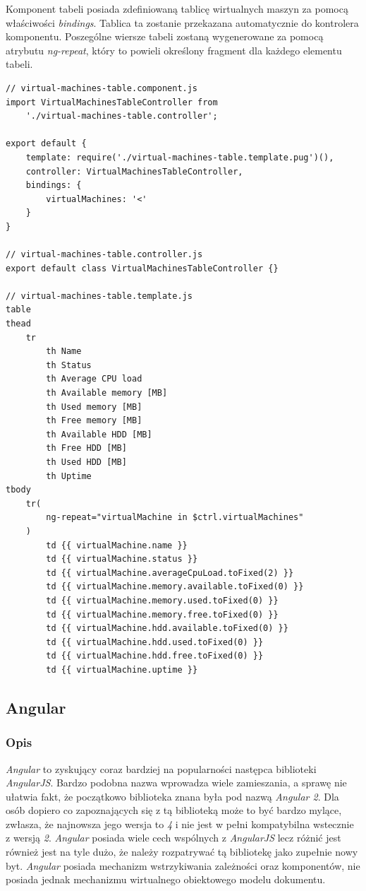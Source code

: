 \documentclass[polish, twoside, 12pt]{mwart}
\begin{document}
Komponent tabeli posiada zdefiniowaną tablicę wirtualnych maszyn za pomocą właściwości \emph{bindings}. Tablica ta zostanie przekazana automatycznie do kontrolera komponentu. Poszególne wiersze tabeli zostaną wygenerowane za pomocą atrybutu \emph{ng-repeat}, który to powieli określony fragment dla każdego elementu tabeli.

\begin{lstlisting}[caption=Komponent tabeli]
// virtual-machines-table.component.js
import VirtualMachinesTableController from
    './virtual-machines-table.controller';

export default {
    template: require('./virtual-machines-table.template.pug')(),
    controller: VirtualMachinesTableController,
    bindings: {
        virtualMachines: '<'
    }
}

// virtual-machines-table.controller.js
export default class VirtualMachinesTableController {}

// virtual-machines-table.template.js
table
thead
    tr
        th Name
        th Status
        th Average CPU load
        th Available memory [MB]
        th Used memory [MB]
        th Free memory [MB]
        th Available HDD [MB]
        th Free HDD [MB]
        th Used HDD [MB]
        th Uptime
tbody
    tr(
        ng-repeat="virtualMachine in $ctrl.virtualMachines"
    )
        td {{ virtualMachine.name }}
        td {{ virtualMachine.status }}
        td {{ virtualMachine.averageCpuLoad.toFixed(2) }}
        td {{ virtualMachine.memory.available.toFixed(0) }}
        td {{ virtualMachine.memory.used.toFixed(0) }}
        td {{ virtualMachine.memory.free.toFixed(0) }}
        td {{ virtualMachine.hdd.available.toFixed(0) }}
        td {{ virtualMachine.hdd.used.toFixed(0) }}
        td {{ virtualMachine.hdd.free.toFixed(0) }}
        td {{ virtualMachine.uptime }}
\end{lstlisting}

\subsection{Angular}

\subsubsection{Opis}

\emph{Angular} to zyskujący coraz bardziej na popularności następca biblioteki \emph{AngularJS}. Bardzo podobna nazwa wprowadza wiele zamieszania, a sprawę nie ułatwia fakt, że początkowo biblioteka znana była pod nazwą \emph{Angular 2}. Dla osób dopiero co zapoznających się z tą biblioteką może to być bardzo mylące, zwłasza, że najnowsza jego wersja to \emph{4} i nie jest w pełni kompatybilna wstecznie z wersją \emph{2}. \emph{Angular} posiada wiele cech wspólnych z \emph{AngularJS} lecz różnić jest również jest na tyle dużo, że należy rozpatrywać tą bibliotekę jako zupełnie nowy byt. \emph{Angular} posiada mechanizm wstrzykiwania zależności oraz komponentów, nie posiada jednak mechanizmu wirtualnego obiektowego modelu dokumentu.
\end{document}
